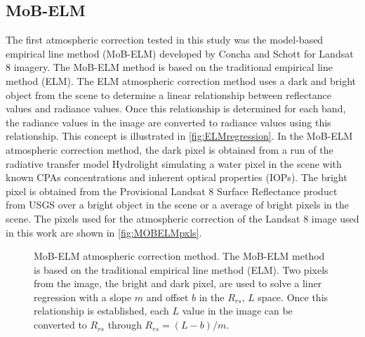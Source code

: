 \documentclass[]{spie}  %
\begin{document}
\subsection{MoB-ELM}
The first atmospheric correction tested in this study was the model-based empirical line method (MoB-ELM) developed by Concha and Schott\cite{Concha2014SPIE} for Landsat 8 imagery. The MoB-ELM method is based on the traditional empirical line method (ELM)\cite{Smith:1999,Schott}. The ELM atmospheric correction method uses a dark and bright object from the scene to determine a linear relationship between reflectance values and radiance values. Once this relationship is determined for each band, the radiance values in the image are converted to radiance values using this relationship. This concept is illustrated in \autoref{fig:ELMregression}. In the MoB-ELM atmospheric correction method, the dark pixel is obtained from a run of the radiative transfer model Hydrolight\cite{MobleyHEtech} simulating a water pixel in the scene with known CPAs concentrations and inherent optical properties (IOPs). The bright pixel is obtained from the Provisional Landsat 8 Surface Reflectance product\cite{L8SurfProduct2015} from USGS over a bright object in the scene or a average of bright pixels in the scene. The pixels used for the atmospheric correction of the Landsat 8 image used in this work are shown in \autoref{fig:MOBELMpxls}.
\begin{figure}[htb]
	\centering
\caption{MoB-ELM atmospheric correction method. The MoB-ELM method is based on the traditional empirical line method (ELM). Two pixels from the image, the bright and dark pixel, are used to solve a liner regression with a slope $m$ and offset $b$ in the $R_{rs}$, $L$ space. Once this relationship is established, each $L$ value in the image can be converted to $R_{rs}$ through $R_{rs}=(L-b)/m$. \label{fig:ELMregression}}
\end{figure}
\end{document}
